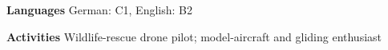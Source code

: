 {\fontsize{10.8}{12.4}\selectfont
\textbf{Languages} \hspace{0.6em} German: C1, English: B2\par
\textbf{Activities} \hspace{0.6em} Wildlife-rescue drone pilot; model-aircraft and gliding enthusiast\par
}
